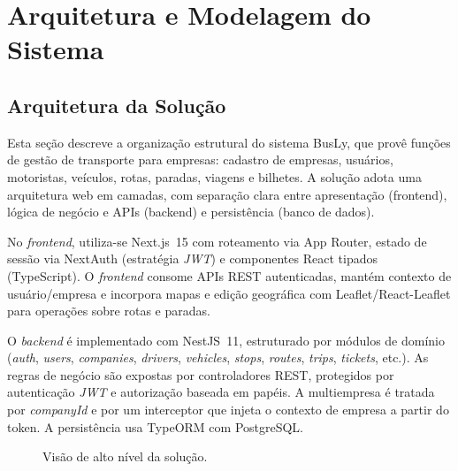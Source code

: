 \chapter{Arquitetura e Modelagem do Sistema} \label{cha:arquitetura}

\section{Arquitetura da Solução}
Esta seção descreve a organização estrutural do sistema BusLy, que provê funções de gestão de transporte para empresas: cadastro de empresas, usuários, motoristas, veículos, rotas, paradas, viagens e bilhetes. A solução adota uma arquitetura web em camadas, com separação clara entre apresentação (frontend), lógica de negócio e APIs (backend) e persistência (banco de dados).

No \textit{frontend}, utiliza-se Next.js~15 com roteamento via App Router, estado de sessão via NextAuth (estratégia \textit{JWT}) e componentes React tipados (TypeScript). O \textit{frontend} consome APIs REST autenticadas, mantém contexto de usuário/empresa e incorpora mapas e edição geográfica com Leaflet/React-Leaflet para operações sobre rotas e paradas.

O \textit{backend} é implementado com NestJS~11, estruturado por módulos de domínio (\textit{auth}, \textit{users}, \textit{companies}, \textit{drivers}, \textit{vehicles}, \textit{stops}, \textit{routes}, \textit{trips}, \textit{tickets}, etc.). As regras de negócio são expostas por controladores REST, protegidos por autenticação \textit{JWT} e autorização baseada em papéis. A multiempresa é tratada por \textit{companyId} e por um interceptor que injeta o contexto de empresa a partir do token. A persistência usa TypeORM com PostgreSQL.

\begin{figure}[H]
\centering
{}
\caption{Visão de alto nível da solução.}
\end{figure}

